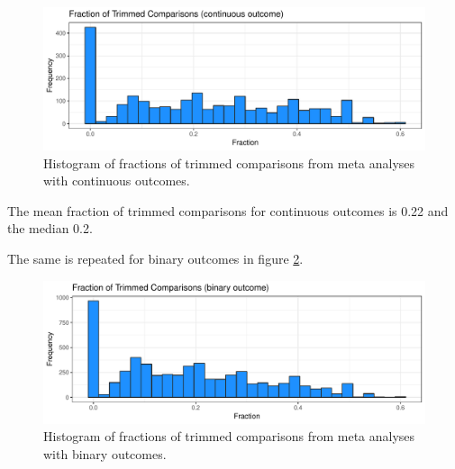 \documentclass[11pt,a4paper,twoside]{book}\usepackage[]{graphicx}\usepackage[]{color}
\newenvironment{knitrout}{}{} %
\begin{document}
\begin{figure}
\begin{knitrout}
\color{fgcolor}

{\centering \includegraphics[width=\textwidth-3cm]{figure/ch02_figunnamed-chunk-22-1} 

}



\end{knitrout}
\caption{Histogram of fractions of trimmed comparisons from meta analyses with continuous outcomes.}
\label{trimfill.cont}
\end{figure}

The mean fraction of trimmed comparisons for continuous outcomes is 0.22 and the median 0.2.

The same is repeated for binary outcomes in figure \ref{trimfill.bin}. 
\begin{figure}
\begin{knitrout}
\color{fgcolor}

{\centering \includegraphics[width=\textwidth-3cm]{figure/ch02_figunnamed-chunk-23-1} 

}



\end{knitrout}
\caption{Histogram of fractions of trimmed comparisons from meta analyses with binary outcomes.}
\label{trimfill.bin}
\end{figure}
\end{document}
